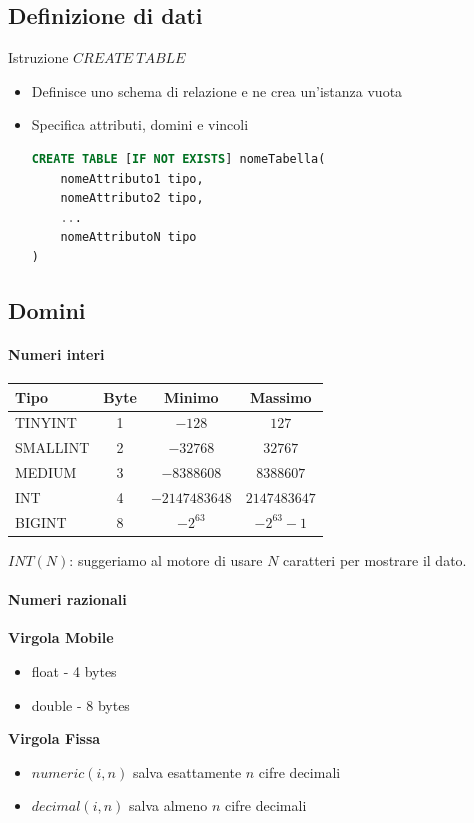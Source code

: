 \documentclass[12pt,a4paper]{article}
\begin{document}
\subsection{Definizione di dati}
\begin{center}
Istruzione $CREATE\ TABLE$
\end{center}
\begin{itemize}
\item Definisce uno schema di relazione e ne crea un'istanza vuota
\item Specifica attributi, domini e vincoli
\flushleft
\begin{lstlisting}[language = SQL]
CREATE TABLE [IF NOT EXISTS] nomeTabella(
	nomeAttributo1 tipo,
	nomeAttributo2 tipo,
	...
	nomeAttributoN tipo
)
\end{lstlisting}
\end{itemize}

\subsection{Domini}
\paragraph{Numeri interi\\}
\flushleft
\begin{center}
\begin{tabular}{lccc}
\textbf{Tipo} & \textbf{Byte} & \textbf{Minimo} & \textbf{Massimo} \\ \hline
TINYINT & 1 & $-128$ & $127$\\ \hline
SMALLINT & 2 & $-32768$ & $32767$\\ \hline
MEDIUM & 3 & $-8388608$ & $8388607$\\ \hline
INT & 4 & $-2147483648$ & $2147483647$\\ \hline
BIGINT & 8 & $-2^{63}$ & $-2^{63}-1$\\ 
\end{tabular}\end{center}
\MidSep \noindent
$INT(N)$: suggeriamo al motore di usare $N$ caratteri per mostrare il dato.

\paragraph{Numeri razionali\\}
\flushleft
\textbf{Virgola Mobile}
\begin{itemize}
\item float - 4 bytes
\item double - 8 bytes
\end{itemize}
\textbf{Virgola Fissa}
\begin{itemize}
\item $numeric(i,n)$ salva esattamente $n$ cifre decimali
\item $decimal(i,n)$ salva almeno $n$ cifre decimali
\end{itemize}
\end{document}
